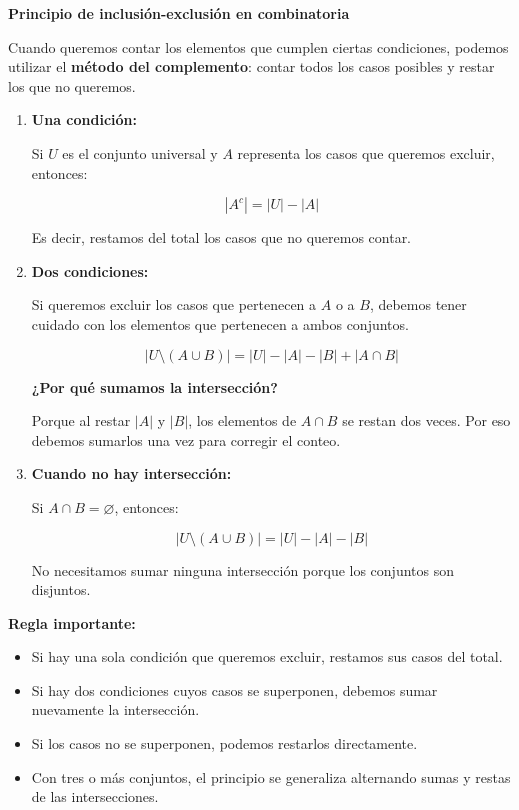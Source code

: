 \begin{definicion}
\textbf{Principio de inclusión-exclusión en combinatoria}

Cuando queremos contar los elementos que cumplen ciertas condiciones, podemos utilizar el \textbf{método del complemento}: contar todos los casos posibles y restar los que no queremos.

\begin{enumerate}
    \item \textbf{Una condición:}

    Si $U$ es el conjunto universal y $A$ representa los casos que queremos excluir, entonces:

    \[
        |A^c| = |U| - |A|
    \]

    Es decir, restamos del total los casos que no queremos contar.

    \item \textbf{Dos condiciones:}

    Si queremos excluir los casos que pertenecen a $A$ o a $B$, debemos tener cuidado con los elementos que pertenecen a ambos conjuntos.

    \[
        |U \setminus (A \cup B)|
        = |U| - |A| - |B| + |A \cap B|
    \]

    \textbf{¿Por qué sumamos la intersección?}

    Porque al restar $|A|$ y $|B|$, los elementos de $A \cap B$ se restan dos veces. Por eso debemos sumarlos una vez para corregir el conteo.

    \item \textbf{Cuando no hay intersección:}

    Si $A \cap B = \varnothing$, entonces:

    \[
        |U \setminus (A \cup B)|
        = |U| - |A| - |B|
    \]

    No necesitamos sumar ninguna intersección porque los conjuntos son disjuntos.
\end{enumerate}

\textbf{Regla importante:}

\begin{itemize}
    \item Si hay una sola condición que queremos excluir, restamos sus casos del total.
    \item Si hay dos condiciones cuyos casos se superponen, debemos sumar nuevamente la intersección.
    \item Si los casos no se superponen, podemos restarlos directamente.
    \item Con tres o más conjuntos, el principio se generaliza alternando sumas y restas de las intersecciones.
\end{itemize}


\end{definicion}
